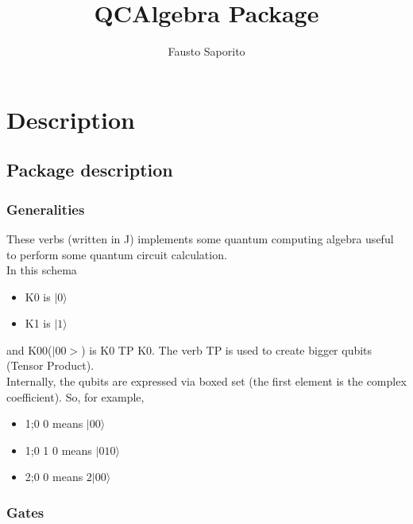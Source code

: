 \documentclass[a4paper,11pt]{amsbook}
\begin{document}
\title{QCAlgebra Package}
\author{Fausto Saporito}
\maketitle
\tableofcontents
\part{Description}

\chapter{Package description}

\section{Generalities}

These verbs (written in J) implements some quantum computing algebra useful to 
perform some quantum circuit calculation.\\

In this schema 
\begin{itemize}
\item K0 is $|0\rangle$ 
\item K1 is $|1\rangle$ 
\end{itemize}

and K00($|00>$) is K0 TP K0. The verb TP is used to create bigger qubits (Tensor Product).\\

Internally, the qubits are expressed via boxed set (the first element is the complex coefficient). So, for example,

\begin{itemize}
\item 1;0 0 means $|00\rangle $
\item 1;0 1 0 means $|010\rangle $
\item 2;0 0 means $2|00\rangle $
\end{itemize}

\section{Gates}
\end{document}
